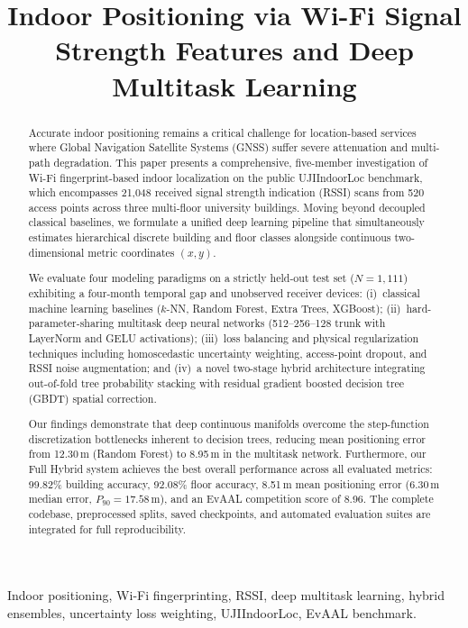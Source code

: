 \documentclass[conference]{IEEEtran}
\title{Indoor Positioning via Wi-Fi Signal Strength Features and Deep Multitask Learning}
\author{
  \IEEEauthorblockN{Team T076 --- Indoor Wi-Fi Positioning Project}
  \IEEEauthorblockA{Department of Computer Science and Engineering\\
    Five-Member Deep Learning Research Project Report}
}
\begin{document}
\maketitle

\begin{abstract}
Accurate indoor positioning remains a critical challenge for location-based services where Global Navigation Satellite Systems (GNSS) suffer severe attenuation and multi-path degradation. This paper presents a comprehensive, five-member investigation of Wi-Fi fingerprint-based indoor localization on the public UJIIndoorLoc benchmark, which encompasses 21,048 received signal strength indication (RSSI) scans from 520 access points across three multi-floor university buildings. Moving beyond decoupled classical baselines, we formulate a unified deep learning pipeline that simultaneously estimates hierarchical discrete building and floor classes alongside continuous two-dimensional metric coordinates $(x, y)$. 

We evaluate four modeling paradigms on a strictly held-out test set ($N = 1{,}111$) exhibiting a four-month temporal gap and unobserved receiver devices: (i)~classical machine learning baselines ($k$-NN, Random Forest, Extra Trees, XGBoost); (ii)~hard-parameter-sharing multitask deep neural networks (512--256--128 trunk with LayerNorm and GELU activations); (iii)~loss balancing and physical regularization techniques including homoscedastic uncertainty weighting, access-point dropout, and RSSI noise augmentation; and (iv)~a novel two-stage hybrid architecture integrating out-of-fold tree probability stacking with residual gradient boosted decision tree (GBDT) spatial correction. 

Our findings demonstrate that deep continuous manifolds overcome the step-function discretization bottlenecks inherent to decision trees, reducing mean positioning error from 12.30\,m (Random Forest) to 8.95\,m in the multitask network. Furthermore, our Full Hybrid system achieves the best overall performance across all evaluated metrics: 99.82\% building accuracy, 92.08\% floor accuracy, 8.51\,m mean positioning error (6.30\,m median error, $P_{90} = 17.58$\,m), and an EvAAL competition score of 8.96. The complete codebase, preprocessed splits, saved checkpoints, and automated evaluation suites are integrated for full reproducibility.
\end{abstract}

\begin{IEEEkeywords}
Indoor positioning, Wi-Fi fingerprinting, RSSI, deep multitask learning, hybrid ensembles, uncertainty loss weighting, UJIIndoorLoc, EvAAL benchmark.
\end{IEEEkeywords}
\end{document}
